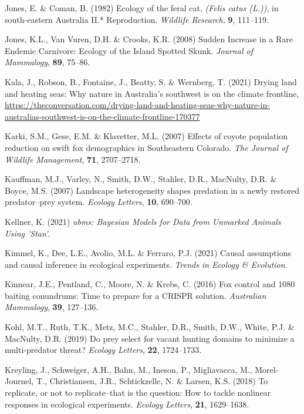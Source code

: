 \documentclass[11pt,a4paper,titlepage,twoside,openright]{style/unimelbthesis}
\begin{document}
\begin{mainmatter}
\leavevmode\hypertarget{ref-jones1982ecology2}{}%
Jones, E. \& Coman, B. (1982) Ecology of the feral cat, \emph{(Felis catus (L.))}, in south-eastern Australia II.* Reproduction. \emph{Wildlife Research}, \textbf{9}, 111--119.

\leavevmode\hypertarget{ref-jones2008sudden}{}%
Jones, K.L., Van Vuren, D.H. \& Crooks, K.R. (2008) Sudden Increase in a Rare Endemic Carnivore: Ecology of the Island Spotted Skunk. \emph{Journal of Mammalogy}, \textbf{89}, 75--86.

\leavevmode\hypertarget{ref-drying2021kala}{}%
Kala, J., Robson, B., Fontaine, J., Beatty, S. \& Wernberg, T. (2021) Drying land and heating seas: Why nature in Australia's southwest is on the climate frontline, \url{https://theconversation.com/drying-land-and-heating-seas-why-nature-in-australias-southwest-is-on-the-climate-frontline-170377}

\leavevmode\hypertarget{ref-karki2007effects}{}%
Karki, S.M., Gese, E.M. \& Klavetter, M.L. (2007) Effects of coyote population reduction on swift fox demographics in Southeastern Colorado. \emph{The Journal of Wildlife Management}, \textbf{71}, 2707--2718.

\leavevmode\hypertarget{ref-kauffman2007landscape}{}%
Kauffman, M.J., Varley, N., Smith, D.W., Stahler, D.R., MacNulty, D.R. \& Boyce, M.S. (2007) Landscape heterogeneity shapes predation in a newly restored predator--prey system. \emph{Ecology Letters}, \textbf{10}, 690--700.

\leavevmode\hypertarget{ref-ubms}{}%
Kellner, K. (2021) \emph{ubms: Bayesian Models for Data from Unmarked Animals Using 'Stan'}.

\leavevmode\hypertarget{ref-kimmel2021causal}{}%
Kimmel, K., Dee, L.E., Avolio, M.L. \& Ferraro, P.J. (2021) Causal assumptions and causal inference in ecological experiments. \emph{Trends in Ecology \& Evolution}.

\leavevmode\hypertarget{ref-kinnear2016fox}{}%
Kinnear, J.E., Pentland, C., Moore, N. \& Krebs, C. (2016) Fox control and 1080 baiting conundrums: Time to prepare for a CRISPR solution. \emph{Australian Mammalogy}, \textbf{39}, 127--136.

\leavevmode\hypertarget{ref-kohl2019prey}{}%
Kohl, M.T., Ruth, T.K., Metz, M.C., Stahler, D.R., Smith, D.W., White, P.J. \& MacNulty, D.R. (2019) Do prey select for vacant hunting domains to minimize a multi-predator threat? \emph{Ecology Letters}, \textbf{22}, 1724--1733.

\leavevmode\hypertarget{ref-kreyling2018replicate}{}%
Kreyling, J., Schweiger, A.H., Bahn, M., Ineson, P., Migliavacca, M., Morel-Journel, T., Christiansen, J.R., Schtickzelle, N. \& Larsen, K.S. (2018) To replicate, or not to replicate--that is the question: How to tackle nonlinear responses in ecological experiments. \emph{Ecology Letters}, \textbf{21}, 1629--1638.


\end{mainmatter}
\end{document}

